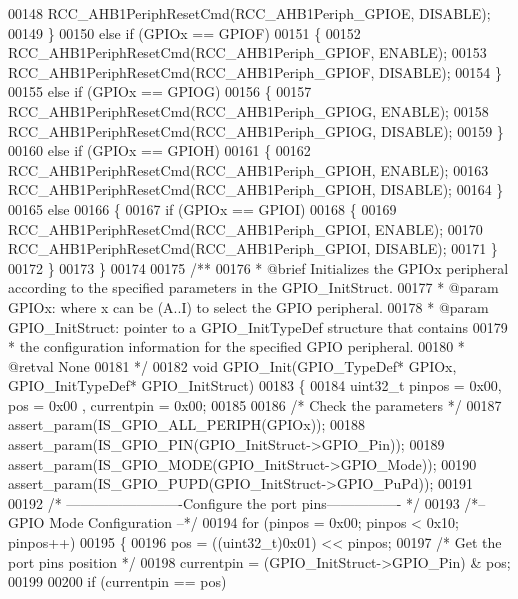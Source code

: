 \begin{DoxyCode}
00148     RCC_AHB1PeriphResetCmd(RCC_AHB1Periph_GPIOE, DISABLE);
00149   \}
00150   \textcolor{keywordflow}{else} \textcolor{keywordflow}{if} (GPIOx == GPIOF)
00151   \{
00152     RCC_AHB1PeriphResetCmd(RCC_AHB1Periph_GPIOF, ENABLE);
00153     RCC_AHB1PeriphResetCmd(RCC_AHB1Periph_GPIOF, DISABLE);
00154   \}
00155   \textcolor{keywordflow}{else} \textcolor{keywordflow}{if} (GPIOx == GPIOG)
00156   \{
00157     RCC_AHB1PeriphResetCmd(RCC_AHB1Periph_GPIOG, ENABLE);
00158     RCC_AHB1PeriphResetCmd(RCC_AHB1Periph_GPIOG, DISABLE);
00159   \}
00160   \textcolor{keywordflow}{else} \textcolor{keywordflow}{if} (GPIOx == GPIOH)
00161   \{
00162     RCC_AHB1PeriphResetCmd(RCC_AHB1Periph_GPIOH, ENABLE);
00163     RCC_AHB1PeriphResetCmd(RCC_AHB1Periph_GPIOH, DISABLE);
00164   \}
00165   \textcolor{keywordflow}{else}
00166   \{
00167     \textcolor{keywordflow}{if} (GPIOx == GPIOI)
00168     \{
00169       RCC_AHB1PeriphResetCmd(RCC_AHB1Periph_GPIOI, ENABLE);
00170       RCC_AHB1PeriphResetCmd(RCC_AHB1Periph_GPIOI, DISABLE);
00171     \}
00172   \}
00173 \}
00174 
00175 \textcolor{comment}{/**}
00176 \textcolor{comment}{  * @brief  Initializes the GPIOx peripheral according to the specified parameters in the
       GPIO\_InitStruct.}
00177 \textcolor{comment}{  * @param  GPIOx: where x can be (A..I) to select the GPIO peripheral.}
00178 \textcolor{comment}{  * @param  GPIO\_InitStruct: pointer to a GPIO\_InitTypeDef structure that contains}
00179 \textcolor{comment}{  *         the configuration information for the specified GPIO peripheral.}
00180 \textcolor{comment}{  * @retval None}
00181 \textcolor{comment}{  */}
00182 \textcolor{keywordtype}{void} GPIO_Init(GPIO\_TypeDef* GPIOx, GPIO\_InitTypeDef* GPIO\_InitStruct)
00183 \{
00184   uint32\_t pinpos = 0x00, pos = 0x00 , currentpin = 0x00;
00185 
00186   \textcolor{comment}{/* Check the parameters */}
00187   assert_param(IS\_GPIO\_ALL\_PERIPH(GPIOx));
00188   assert_param(IS\_GPIO\_PIN(GPIO\_InitStruct->GPIO\_Pin));
00189   assert_param(IS\_GPIO\_MODE(GPIO\_InitStruct->GPIO\_Mode));
00190   assert_param(IS\_GPIO\_PUPD(GPIO\_InitStruct->GPIO\_PuPd));
00191 
00192   \textcolor{comment}{/* -------------------------Configure the port pins---------------- */}
00193   \textcolor{comment}{/*-- GPIO Mode Configuration --*/}
00194   \textcolor{keywordflow}{for} (pinpos = 0x00; pinpos < 0x10; pinpos++)
00195   \{
00196     pos = ((uint32\_t)0x01) << pinpos;
00197     \textcolor{comment}{/* Get the port pins position */}
00198     currentpin = (GPIO\_InitStruct->GPIO_Pin) & pos;
00199 
00200     \textcolor{keywordflow}{if} (currentpin == pos)

\end{DoxyCode}
